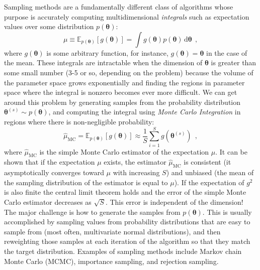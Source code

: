 \documentclass[12pt,dvipsnames]{report}
\newcommand{\ud}{\,\mathrm{d}}
\renewcommand{\vec}[1]{\boldsymbol{\mathbf{#1}}}
\newcommand{\hquad}{~~}
\begin{document}
Sampling methods are a fundamentally different class of algorithms whose
purpose is accurately computing multidimensional \emph{integrals} such as expectation 
values over some distribution $p(\vec{\theta})$:
\begin{equation}
    \mu\equiv \mathbb{E}_{p(\vec \theta)}[g(\vec \theta)]=\int g(\vec \theta) p(\vec \theta) \ud \vec \theta
    \hquad,
    \label{eq:general_expectation}
\end{equation}
where $g(\vec \theta)$ is some arbitrary function, for instance, $g(\vec \theta)=\vec \theta$
in the case of the mean.
These integrals are intractable when the dimension of $\vec{\theta}$ is greater than
some small number (3-5 or so, depending on the problem)
because  the volume of the parameter space grows exponentially and finding
the regions in parameter space where the integral is nonzero becomes ever more difficult.
We can get around this problem by generating samples from the probability distribution
$\vec{\theta}^{(s)}\sim p(\vec{\theta})$, and computing the integral using
\emph{Monte Carlo Integration} in regions where there is non-negligible probability:
\begin{equation}
    \hat{\mu}_\mathrm{MC}=\mathbb{E}_{p(\vec \theta)}[g(\vec \theta)] \approx \frac{1}{S} \sum_{i=1}^{S} g\left(\vec \theta^{(s)}\right)
    \hquad,
    \label{eq:monte_carlo_estimator}
\end{equation}
where $\hat{\mu}_\mathrm{MC}$ is the simple Monte Carlo estimator of the expectation
$\mu$.
It can be shown that if the expectation $\mu$ exists, the estimator
$\hat{\mu}_\mathrm{MC}$ is consistent (it asymptotically converges toward $\mu$ with
increasing $S$) and unbiased (the mean of the sampling distribution of the estimator
is equal to $\mu$). If the expectation of $g^2$ is also finite the central limit
theorem holds and the error of the simple  Monte Carlo estimator decreases as
$\sqrt{S}$. This error is independent of the dimension!
The major challenge is how to generate the samples from $p(\vec{\theta})$. This
is usually accomplished by 
sampling values from probability distributions that are easy to sample from
(most often, multivariate normal distributions), and then reweighting those
samples at each iteration of the algorithm so that they match the target
distribution. Examples of sampling methods include Markov chain Monte Carlo
(MCMC), importance sampling, and rejection sampling.
\end{document}
